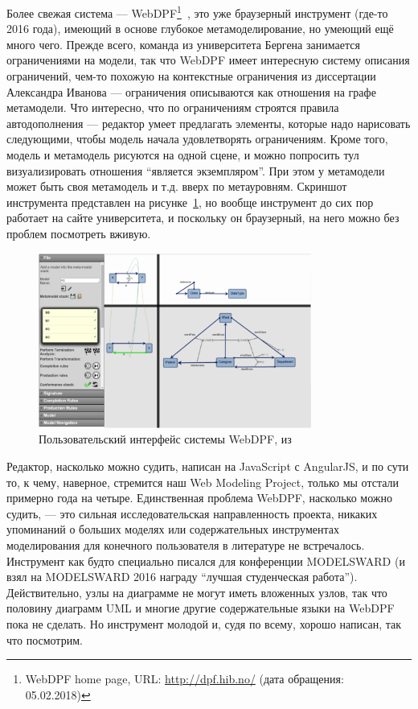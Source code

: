 \documentclass[a5paper]{article}
\begin{document}
Более свежая система --- WebDPF\footnote{WebDPF home page, URL: \url{http://dpf.hib.no/} (дата обращения: 05.02.2018)}~\cite{rabbi2016webdpf}, это уже браузерный инструмент (где-то 2016 года), имеющий в основе глубокое метамоделирование, но умеющий ещё много чего. Прежде всего, команда из университета Бергена занимается ограничениями на модели, так что WebDPF имеет интересную систему описания ограничений, чем-то похожую на контекстные ограничения из диссертации Александра Иванова --- ограничения описываются как отношения на графе метамодели. Что интересно, что по ограничениям строятся правила автодополнения --- редактор умеет предлагать элементы, которые надо нарисовать следующими, чтобы модель начала удовлетворять ограничениям. Кроме того, модель и метамодель рисуются на одной сцене, и можно попросить тул визуализировать отношения ``является экземпляром''. При этом у метамодели может быть своя метамодель и т.д. вверх по метауровням. Скриншот инструмента представлен на рисунке~\ref{figure:webdpf}, но вообще инструмент до сих пор работает на сайте университета, и поскольку он браузерный, на него можно без проблем посмотреть вживую.

\begin{figure}
	\begin{center}
		\includegraphics[width=0.8\textwidth]{webdpf.png}
	\end{center}
	\caption{Пользовательский интерфейс системы WebDPF, из~\cite{rabbi2016webdpf}}
	\label{figure:webdpf}
\end{figure}

Редактор, насколько можно судить, написан на JavaScript с AngularJS, и по сути то, к чему, наверное, стремится наш Web Modeling Project, только мы отстали примерно года на четыре. Единственная проблема WebDPF, насколько можно судить, --- это сильная исследовательская направленность проекта, никаких упоминаний о больших моделях или содержательных инструментах моделирования для конечного пользователя в литературе не встречалось. Инструмент как будто специально писался для конференции MODELSWARD (и взял на MODELSWARD 2016 награду ``лучшая студенческая работа''). Действительно, узлы на диаграмме не могут иметь вложенных узлов, так что половину диаграмм UML и многие другие содержательные языки на WebDPF пока не сделать. Но инструмент молодой и, судя по всему, хорошо написан, так что посмотрим.
\end{document}
